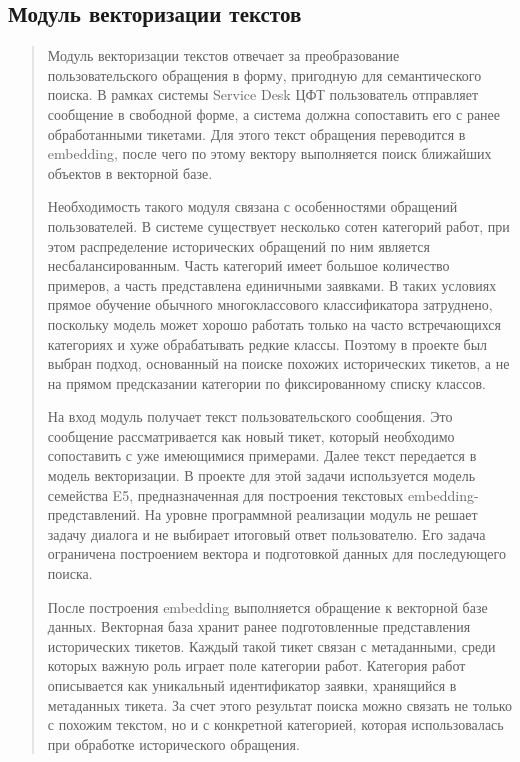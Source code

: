 \documentclass[
]{article}
\begin{document}
\hypertarget{ux43cux43eux434ux443ux43bux44c-ux432ux435ux43aux442ux43eux440ux438ux437ux430ux446ux438ux438-ux442ux435ux43aux441ux442ux43eux432}{%
\subsection{Модуль векторизации
текстов}\label{ux43cux43eux434ux443ux43bux44c-ux432ux435ux43aux442ux43eux440ux438ux437ux430ux446ux438ux438-ux442ux435ux43aux441ux442ux43eux432}}

\begin{quote}
Модуль векторизации текстов отвечает за преобразование пользовательского
обращения в форму, пригодную для семантического поиска. В рамках системы
Service Desk ЦФТ пользователь отправляет сообщение в свободной форме, а
система должна сопоставить его с ранее обработанными тикетами. Для этого
текст обращения переводится в embedding, после чего по этому вектору
выполняется поиск ближайших объектов в векторной базе.

Необходимость такого модуля связана с особенностями обращений
пользователей. В системе существует несколько сотен категорий работ, при
этом распределение исторических обращений по ним является
несбалансированным. Часть категорий имеет большое количество примеров, а
часть представлена единичными заявками. В таких условиях прямое обучение
обычного многоклассового классификатора затруднено, поскольку модель
может хорошо работать только на часто встречающихся категориях и хуже
обрабатывать редкие классы. Поэтому в проекте был выбран подход,
основанный на поиске похожих исторических тикетов, а не на прямом
предсказании категории по фиксированному списку классов.

На вход модуль получает текст пользовательского сообщения. Это сообщение
рассматривается как новый тикет, который необходимо сопоставить с уже
имеющимися примерами. Далее текст передается в модель векторизации. В
проекте для этой задачи используется модель семейства E5,
предназначенная для построения текстовых embedding-представлений. На
уровне программной реализации модуль не решает задачу диалога и не
выбирает итоговый ответ пользователю. Его задача ограничена построением
вектора и подготовкой данных для последующего поиска.

После построения embedding выполняется обращение к векторной базе
данных. Векторная база хранит ранее подготовленные представления
исторических тикетов. Каждый такой тикет связан с метаданными, среди
которых важную роль играет поле категории работ. Категория работ
описывается как уникальный идентификатор заявки, хранящийся в метаданных
тикета. За счет этого результат поиска можно связать не только с похожим
текстом, но и с конкретной категорией, которая использовалась при
обработке исторического обращения.


\end{quote}
\end{document}
